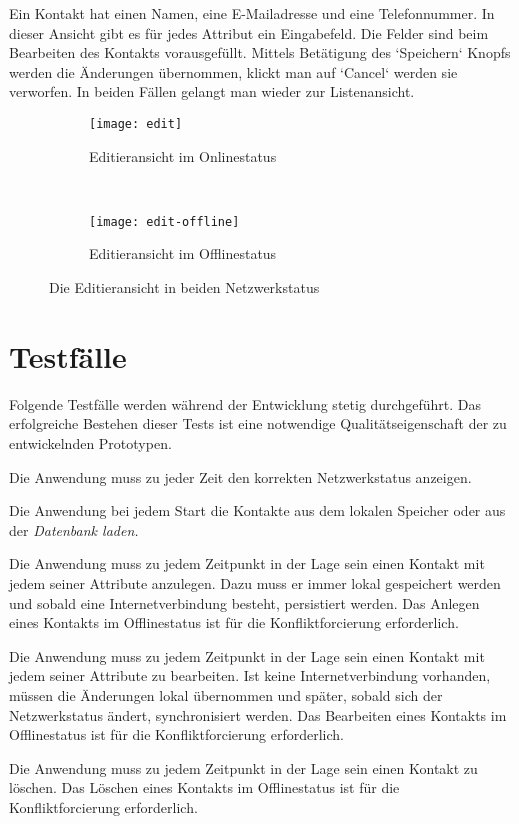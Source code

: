 Ein Kontakt hat einen Namen, eine E-Mailadresse und eine Telefonnummer. In dieser Ansicht gibt es für jedes Attribut ein Eingabefeld. Die Felder sind beim Bearbeiten des Kontakts vorausgefüllt. Mittels Betätigung des `Speichern` Knopfs werden die Änderungen übernommen, klickt man auf `Cancel` werden sie verworfen. In beiden Fällen gelangt man wieder zur Listenansicht.
\begin{figure}[H]
  \centering
  \begin{subfigure}[t]{0.49\textwidth}
          \texttt{[image: edit]}
          \caption{Editieransicht im Onlinestatus}
          \label{fig:edit-online}
  \end{subfigure}
  ~ 
  \begin{subfigure}[t]{0.49\textwidth}
          \texttt{[image: edit-offline]}
          \caption{Editieransicht im Offlinestatus}
          \label{fig:edit-offline}
  \end{subfigure}
  \grayRule
  \caption{Die Editieransicht in beiden Netzwerkstatus}
  \label{fig:edit}
\end{figure}
%
%
\section{Testfälle}
Folgende Testfälle werden während der Entwicklung stetig durchgeführt. Das erfolgreiche Bestehen dieser Tests ist eine notwendige Qualitätseigenschaft der zu entwickelnden Prototypen.
\begin{description}[leftmargin=0.7cm,style=nextline]
\item[Netzwerkstatus:] 
Die Anwendung muss zu jeder Zeit den korrekten Netzwerkstatus anzeigen.\\
\item[Kontakte lesen:] 
Die Anwendung bei jedem Start die Kontakte aus dem lokalen Speicher oder aus der \it{Datenbank} laden.\\
\item[Kontakt anlegen:] 
Die Anwendung muss zu jedem Zeitpunkt in der Lage sein einen Kontakt mit jedem seiner Attribute anzulegen. Dazu muss er immer lokal gespeichert werden und sobald eine Internetverbindung besteht, persistiert werden.
Das Anlegen eines Kontakts im Offlinestatus ist für die Konfliktforcierung erforderlich.\\
\item[Kontakt bearbeiten:] 
Die Anwendung muss zu jedem Zeitpunkt in der Lage sein einen Kontakt mit jedem seiner Attribute zu bearbeiten. Ist keine Internetverbindung vorhanden, müssen die Änderungen lokal übernommen und später, sobald sich der Netzwerkstatus ändert, synchronisiert werden.
Das Bearbeiten eines Kontakts im Offlinestatus ist für die Konfliktforcierung erforderlich.\\
\item[Kontakt löschen:] 
Die Anwendung muss zu jedem Zeitpunkt in der Lage sein einen Kontakt zu löschen.
Das Löschen eines Kontakts im Offlinestatus ist für die Konfliktforcierung erforderlich.
\end{description}